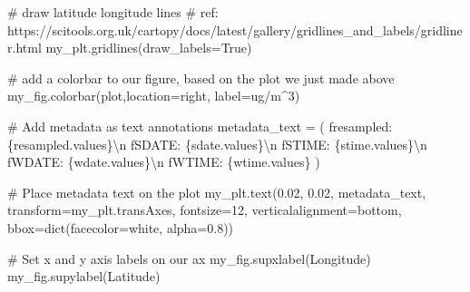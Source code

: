 \documentclass[
  letterpaper,
  DIV=11,
  numbers=noendperiod]{scrreprt}
\newenvironment{Shaded}{\begin{snugshade}}{\end{snugshade}}
\newcommand{\BuiltInTok}[1]{\textcolor[rgb]{0.00,0.23,0.31}{#1}}
\newcommand{\CharTok}[1]{\textcolor[rgb]{0.13,0.47,0.30}{#1}}
\newcommand{\CommentTok}[1]{\textcolor[rgb]{0.37,0.37,0.37}{#1}}
\newcommand{\DecValTok}[1]{\textcolor[rgb]{0.68,0.00,0.00}{#1}}
\newcommand{\FloatTok}[1]{\textcolor[rgb]{0.68,0.00,0.00}{#1}}
\newcommand{\NormalTok}[1]{\textcolor[rgb]{0.00,0.23,0.31}{#1}}
\newcommand{\OperatorTok}[1]{\textcolor[rgb]{0.37,0.37,0.37}{#1}}
\newcommand{\SpecialCharTok}[1]{\textcolor[rgb]{0.37,0.37,0.37}{#1}}
\newcommand{\SpecialStringTok}[1]{\textcolor[rgb]{0.13,0.47,0.30}{#1}}
\newcommand{\StringTok}[1]{\textcolor[rgb]{0.13,0.47,0.30}{#1}}
\newcommand{\VariableTok}[1]{\textcolor[rgb]{0.07,0.07,0.07}{#1}}
\begin{document}
\begin{Shaded}
\begin{Highlighting}[]
\CommentTok{\# draw latitude longitude lines}
\CommentTok{\# ref: https://scitools.org.uk/cartopy/docs/latest/gallery/gridlines\_and\_labels/gridliner.html}
\NormalTok{my\_plt.gridlines(draw\_labels}\OperatorTok{=}\VariableTok{True}\NormalTok{)}

\CommentTok{\# add a colorbar to our figure, based on the plot we just made above}
\NormalTok{my\_fig.colorbar(plot,location}\OperatorTok{=}\StringTok{\textquotesingle{}right\textquotesingle{}}\NormalTok{, label}\OperatorTok{=}\StringTok{\textquotesingle{}ug/m\^{}3\textquotesingle{}}\NormalTok{)}

\CommentTok{\# Add metadata as text annotations}
\NormalTok{metadata\_text }\OperatorTok{=}\NormalTok{ (}
    \SpecialStringTok{f\textquotesingle{}resampled: }\SpecialCharTok{\{}\NormalTok{resampled}\SpecialCharTok{.}\NormalTok{values}\SpecialCharTok{\}}\CharTok{\textbackslash{}n}\SpecialStringTok{\textquotesingle{}}
    \SpecialStringTok{f\textquotesingle{}SDATE: }\SpecialCharTok{\{}\NormalTok{sdate}\SpecialCharTok{.}\NormalTok{values}\SpecialCharTok{\}}\CharTok{\textbackslash{}n}\SpecialStringTok{\textquotesingle{}}
    \SpecialStringTok{f\textquotesingle{}STIME: }\SpecialCharTok{\{}\NormalTok{stime}\SpecialCharTok{.}\NormalTok{values}\SpecialCharTok{\}}\CharTok{\textbackslash{}n}\SpecialStringTok{\textquotesingle{}}
    \SpecialStringTok{f\textquotesingle{}WDATE: }\SpecialCharTok{\{}\NormalTok{wdate}\SpecialCharTok{.}\NormalTok{values}\SpecialCharTok{\}}\CharTok{\textbackslash{}n}\SpecialStringTok{\textquotesingle{}}
    \SpecialStringTok{f\textquotesingle{}WTIME: }\SpecialCharTok{\{}\NormalTok{wtime}\SpecialCharTok{.}\NormalTok{values}\SpecialCharTok{\}}\SpecialStringTok{\textquotesingle{}}
\NormalTok{)}

\CommentTok{\# Place metadata text on the plot}
\NormalTok{my\_plt.text(}\FloatTok{0.02}\NormalTok{, }\FloatTok{0.02}\NormalTok{, metadata\_text, transform}\OperatorTok{=}\NormalTok{my\_plt.transAxes,}
\NormalTok{            fontsize}\OperatorTok{=}\DecValTok{12}\NormalTok{, verticalalignment}\OperatorTok{=}\StringTok{\textquotesingle{}bottom\textquotesingle{}}\NormalTok{, bbox}\OperatorTok{=}\BuiltInTok{dict}\NormalTok{(facecolor}\OperatorTok{=}\StringTok{\textquotesingle{}white\textquotesingle{}}\NormalTok{, alpha}\OperatorTok{=}\FloatTok{0.8}\NormalTok{))}

\CommentTok{\# Set x and y axis labels on our ax}
\NormalTok{my\_fig.supxlabel(}\StringTok{\textquotesingle{}Longitude\textquotesingle{}}\NormalTok{)}
\NormalTok{my\_fig.supylabel(}\StringTok{\textquotesingle{}Latitude\textquotesingle{}}\NormalTok{)}


\end{Highlighting}
\end{Shaded}
\end{document}

